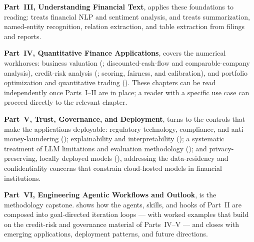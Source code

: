 \textbf{Part~III, Understanding Financial Text}, applies these foundations to
reading:  treats financial NLP and sentiment
analysis, and  treats summarization,
named-entity recognition, relation extraction, and table extraction from
filings and reports.

\textbf{Part~IV, Quantitative Finance Applications}, covers the numerical
workhorses: business valuation (; discounted-cash-flow
and comparable-company analysis), credit-risk analysis
(; scoring, fairness, and calibration), and portfolio
optimization and quantitative trading ().
These chapters can be read independently once Parts~I--II are in place; a
reader with a specific use case can proceed directly to the relevant chapter.

\textbf{Part~V, Trust, Governance, and Deployment}, turns to the controls that
make the applications deployable: regulatory technology, compliance, and
anti-money-laundering (); explainability and
interpretability (); a systematic treatment of
LLM limitations and evaluation methodology
(); and privacy-preserving, locally
deployed models (), addressing the
data-residency and confidentiality concerns that constrain cloud-hosted
models in financial institutions.

\textbf{Part~VI, Engineering Agentic Workflows and Outlook}, is the
methodology capstone.   shows how the agents,
skills, and hooks of Part~II are composed into goal-directed iteration loops
--- with worked examples that build on the credit-risk and governance material
of Parts~IV--V --- and  closes with emerging
applications, deployment patterns, and future directions.


